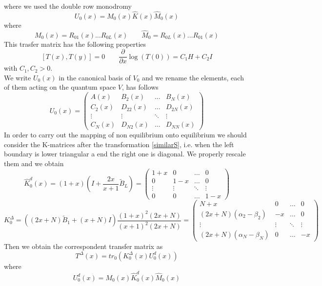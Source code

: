 \documentclass[11pt]{article}
\numberwithin{equation}{section}
\numberwithin{equation}{subsection}
\begin{document}
where we used the double row monodromy
\begin{equation}
	U_{0}(x)=M_{0}(x)\widehat{K}(x)\widehat{M}_{0}(x)
\end{equation}
where 
\begin{equation}
	M_{0}(x)=R_{01}(x)\ldots R_{0L}(x)\qquad \widehat{M}_{0}=R_{0L}(x)\ldots R_{01}(x)
\end{equation}
This trasfer matrix has the following properties
\begin{equation}
	\left[T(x),T(y)\right]=0\qquad \frac{\partial}{\partial x}\log (T(0))=C_{1}H+C_{2}I
\end{equation}
with $C_{1},C_{2}>0$. \\
We write $U_{0}(x)$ in the canonical basis of $V_{0}$ and we rename the elements, each of them acting on the quantum space $V$, has follows
\begin{equation}
	U_{0}(x)=\begin{pmatrix}
		A(x)&B_{2}(x)&\ldots&B_{N}(x)\\
		C_{2}(x)&D_{22}(x)&\ldots&D_{2N}(x)\\
		\vdots&\vdots&\ddots&\vdots\\
		C_{N}(x)&D_{N2}(x)&\ldots&D_{NN}(x)
	\end{pmatrix}
\end{equation}
In order to carry out the mapping of non equilibrium onto equilibrium we should consider the K-matrices after the transformation \eqref{similarS}, i.e. when the left boundary is lower triangular a end the right one is diagonal. We properly rescale them and we obtain
\begin{equation}
	\widehat{K}_{0}^{d}(x)=(1+x)\left(I+\frac{2x}{x+1}\widetilde{B}_{L}\right)=\begin{pmatrix}
		1+x&0&\ldots&0\\
		0&1-x&\ldots&0\\
		\vdots&\vdots&\ddots&\vdots\\
		0&0&\ldots&1-x
	\end{pmatrix}
\end{equation}
\begin{equation}
	K_{0}^{\Delta}=\left((2x+N)\widetilde{B}_{1}+(x+N)I\right)\frac{(1+x)^{2}(2x+N)}{(x+1)^{2}(2x+N)}=\begin{pmatrix}
		N+x&0&\ldots&0\\
		(2x+N)(\alpha_{2}-\beta_{2})&-x&\ldots&0\\
		\vdots&\vdots&\ddots&\vdots\\
		(2x+N)(\alpha_{N}-\beta_{N})&0&\ldots&-x
	\end{pmatrix}
\end{equation}
Then we obtain the correspondent transfer matrix as
\begin{equation}
	T^{\Delta}(x)=tr_{0}\left(K_{0}^{\Delta}(x)U_{0}^{d}(x)\right)
\end{equation}
where
\begin{equation}
	U_{0}^{d}(x)=M_{0}(x)\widehat{K}_{0}^{d}(x)\widehat{M}_{0}(x)
\end{equation}
\end{document}
